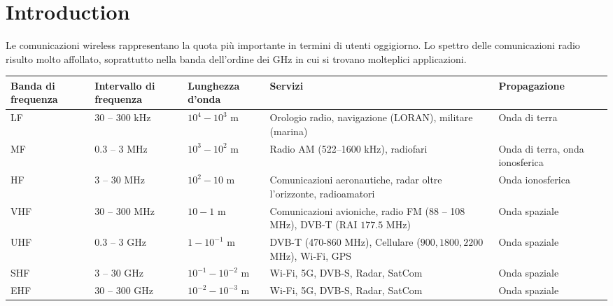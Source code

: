 \section*{Introduction}


Le comunicazioni wireless rappresentano la quota più importante in termini di utenti oggigiorno. Lo spettro delle comunicazioni radio risulto molto affollato, soprattutto nella banda dell'ordine dei GHz in cui si trovano molteplici applicazioni.

\begin{table}[h!]
\centering
\begin{tabular}{ | m{2cm} | m{3cm} | m{2.5cm} | m{4cm} | m{2.5cm} | }
\hline
Banda di frequenza & Intervallo di frequenza & Lunghezza d'onda & Servizi & Propagazione \\
\hline
LF & 30 -- 300 kHz & \(10^{4} - 10^{3}\) m & Orologio radio, navigazione (LORAN), militare (marina) & Onda di terra \\
\hline
MF & 0.3 -- 3 MHz & \(10^{3} - 10^{2}\) m & Radio AM (522--1600 kHz), radiofari & Onda di terra, onda ionosferica \\
\hline
HF & 3 -- 30 MHz & \(10^{2} - 10\) m & Comunicazioni aeronautiche, radar oltre l'orizzonte, radioamatori & Onda ionosferica \\
\hline
VHF & 30 -- 300 MHz & \(10 - 1\) m & Comunicazioni avioniche, radio FM (88 -- 108 MHz), DVB-T (RAI \(177.5\) MHz) & Onda spaziale \\
\hline
UHF & 0.3 -- 3 GHz & \(1 - 10^{-1}\) m & DVB-T (470-860 MHz), Cellulare (\(900,1800,2200\) MHz), Wi-Fi, GPS & Onda spaziale \\
\hline
SHF & 3 -- 30 GHz & \(10^{-1} - 10^{-2}\) m & Wi-Fi, 5G, DVB-S, Radar, SatCom & Onda spaziale \\
\hline
EHF & 30 -- 300 GHz & \(10^{-2} - 10^{-3}\) m & Wi-Fi, 5G, DVB-S, Radar, SatCom & Onda spaziale \\
\hline
\end{tabular}
\end{table}

